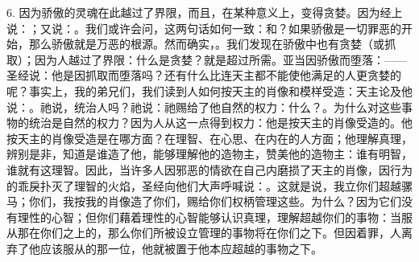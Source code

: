 6. 因为骄傲的灵魂在此越过了界限，而且，在某种意义上，变得贪婪。因为经上说：；又说：。我们或许会问，这两句话如何一致：和？如果骄傲是一切罪恶的开始，那么骄傲就是万恶的根源。然而确实，。我们发现在骄傲中也有贪婪（或抓取）；因为人越过了界限：什么是贪婪？就是超过所需。亚当因骄傲而堕落：——圣经说：他是因抓取而堕落吗？还有什么比连天主都不能使他满足的人更贪婪的呢？事实上，我的弟兄们，我们读到人如何按天主的肖像和模样受造：天主论及他说：。祂说，统治人吗？祂说：祂赐给了他自然的权力：什么？。为什么对这些事物的统治是自然的权力？因为人从这一点得到权力：他是按天主的肖像受造的。他按天主的肖像受造是在哪方面？在理智、在心思、在内在的人方面；他理解真理，辨别是非，知道是谁造了他，能够理解他的造物主，赞美他的造物主：谁有明智，谁就有这理智。因此，当许多人因邪恶的情欲在自己内磨损了天主的肖像，因行为的乖戾扑灭了理智的火焰，圣经向他们大声呼喊说：。这就是说，我立你们超越骡马；你们，我按我的肖像造了你们，赐给你们权柄管理这些。为什么？因为它们没有理性的心智；但你们藉着理性的心智能够认识真理，理解超越你们的事物：当服从那在你们之上的，那么你们所被设立管理的事物将在你们之下。但因着罪，人离弃了他应该服从的那一位，他就被置于他本应超越的事物之下。\par

